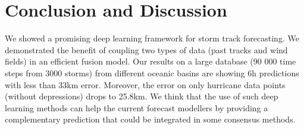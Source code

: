 \chapter{Conclusion and Discussion}

We showed a promising deep learning framework for storm track forecasting. We demonstrated the benefit of coupling two types of data (past tracks and wind fields) in an efficient fusion model. Our results on a large database (90 000 time steps from 3000 storms) from different oceanic basins are showing 6h predictions with less than 33km error. Moreover, the error on only hurricane data points (without depressions) drops to 25.8km. We think that the use of such deep learning methods can help the current forecast modellers by providing a complementary prediction that could be integrated in some consensus methods.


